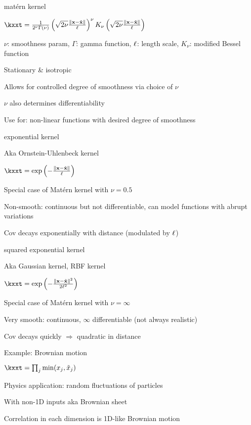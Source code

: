 \documentclass[11pt,compress,t,notes=noshow, xcolor=table]{beamer}
\begin{document}
\begin{framei}{matérn kernel}
\item $\kxxt = \frac{1}{2^\nu \Gamma(\nu)} \left( \sqrt{2 \nu} \frac{\xxtnorm}{\ls} \right)^\nu K_\nu \left( \sqrt{2 \nu} \frac{\xxtnorm}{\ls} \right)$
\item $\nu$: smoothness param, $\Gamma$: gamma function, $\ell$: length scale, $K_\nu$: modified Bessel function
\item Stationary \& isotropic
\item Allows for controlled degree of smoothness via choice of $\nu$
\item $\nu$ also determines differentiability
\item Use for: non-linear functions with desired degree of smoothness
\vfill
{}
\end{framei}

\begin{framei}{exponential kernel}
\item Aka Ornstein-Uhlenbeck kernel
\item $\kxxt = \exp \left(-\frac{\xxtnorm}{\ls} \right)$
\item Special case of Matérn kernel with $\nu = 0.5$
\item Non-smooth: continuous but not differentiable, can model functions with abrupt variations
\item Cov decays exponentially with distance (modulated by $\ell$)
\end{framei}

\begin{framei}{squared exponential kernel}
\item Aka Gaussian kernel, RBF kernel
\item $\kxxt = \exp \left(-\frac{\xxtnorm^2}{2\ls^2} \right)$
\item Special case of Matérn kernel with $\nu = \infty$
\item Very smooth: continuous, $\infty$ differentiable (not always realistic)
\item Cov decays quickly $\Rightarrow$ quadratic in distance
\end{framei}

\begin{framei}[sep=S]{Example: Brownian motion}
\item $ \kxxt = \prod_j \min (x_j, \tilde{x}_j)$
\item Physics application: random fluctuations of particles
\item With non-1D inputs aka Brownian sheet
\item Correlation in each dimension is 1D-like Brownian motion
\vfill
{}
\end{framei}
\end{document}
